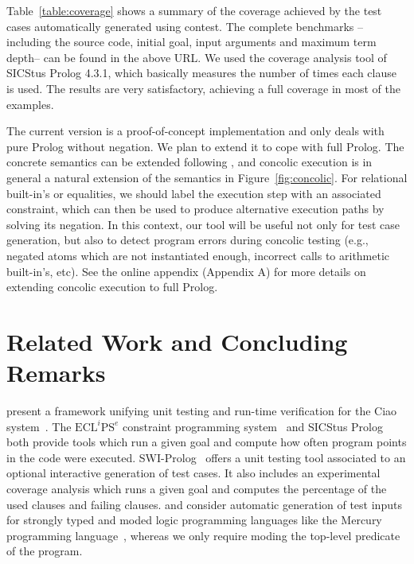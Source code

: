 \documentclass[fleqn]{tlp}
\begin{document}
Table~\ref{table:coverage} shows a summary of the coverage achieved by
the test cases automatically generated using \textsf{contest}. The
complete benchmarks --including the source code, initial goal, input
arguments and maximum term depth-- 
can be found in the above URL.
We used the coverage analysis tool of SICStus Prolog 4.3.1, which
basically measures the number of times each clause is used. The
results are very satisfactory, achieving a full coverage in most of
the examples.

The current version is a proof-of-concept implementation and only
deals with pure Prolog without negation. We plan to extend it to cope
with full Prolog. The concrete semantics can be extended following
\cite{SESGF11}, and concolic execution is in general a natural
extension of the semantics in Figure~\ref{fig:concolic}. 
For relational built-in's or
equalities, we should label the execution step with an associated
constraint, which can then be used to produce alternative execution
paths by solving its negation. In this context, our tool will be
useful not only for test case generation, but also to detect program
errors during concolic testing (e.g., negated atoms which are not
instantiated enough, incorrect calls to arithmetic built-in's, etc).
See the online appendix (Appendix A) for more details on extending
concolic execution to full Prolog.

\section{Related Work and Concluding Remarks} \label{relwork}

present a framework unifying unit testing and 
run-time verification for the 
Ciao system~\cite{DBLP:journals/tplp/HermenegildoBCLMMP12}.
The $\mathrm{ECL}^i\mathrm{PS}^e$ constraint programming 
system~\cite{DBLP:journals/tplp/SchimpfS12}
and SICStus Prolog~\cite{DBLP:journals/tplp/CarlssonM12}
both provide  tools which run a given goal and compute
how often program points in the code were executed.
SWI-Prolog~\cite{wielemaker:2011:tplp} offers a unit testing tool
associated to an optional interactive generation of test cases.
It also includes an experimental coverage analysis which runs a given goal
and computes the percentage of the used clauses and failing clauses.
 and 
consider automatic generation of test inputs for  strongly typed and moded logic
programming languages like the Mercury programming 
language~\cite{Somogyi96a}, whereas we only require moding the top-level predicate of the program.
\end{document}
